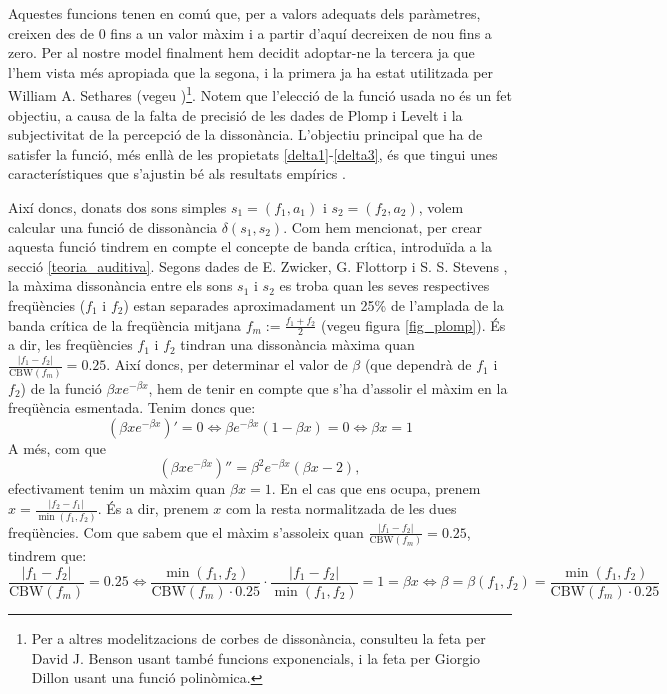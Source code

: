 \documentclass{article}
\theoremstyle{math}
\theoremstyle{TheoremNum}
\newcommand{\0}{\ensuremath{\vb{0}}}
\begin{document}
Aquestes funcions tenen en comú que, per a valors adequats dels paràmetres, creixen des de 0 fins a un valor màxim i a partir d'aquí decreixen de nou fins a zero. Per al nostre model finalment hem decidit adoptar-ne la tercera ja que l'hem vista més apropiada que la segona, i la primera ja ha estat utilitzada per William A. Sethares (vegeu \cite{sethares1})\footnote{Per a altres modelitzacions de corbes de dissonància, consulteu la feta per David J. Benson \cite{benson} usant també funcions exponencials, i la feta per Giorgio Dillon \cite{dillon} usant una funció polinòmica.}. Notem que l'elecció de la funció usada no és un fet objectiu, a causa de la falta de precisió de les dades de Plomp i Levelt i la subjectivitat de la percepció de la dissonància. L'objectiu principal que ha de satisfer la funció, més enllà de les propietats \ref{delta1}-\ref{delta3}, és que tingui unes característiques que s'ajustin bé als resultats empírics \cite{benson}.\par
Així doncs, donats dos sons simples $s_1=(f_1,a_1)$ i $s_2=(f_2,a_2)$, volem calcular una funció de dissonància $\delta(s_1,s_2)$. Com hem mencionat, per crear aquesta funció tindrem en compte el concepte de banda crítica, introduïda a la secció \ref{teoria_auditiva}. Segons dades de E. Zwicker, G. Flottorp i S. S. Stevens \cite{zwicker}, la màxima dissonància entre els sons $s_1$ i $s_2$ es troba quan les seves respectives freqüències ($f_1$ i $f_2$) estan separades aproximadament un 25\% de l'amplada de la banda crítica de la freqüència mitjana $f_m:=\frac{f_1+f_2}{2}$ (vegeu figura \ref{fig_plomp}). És a dir, les freqüències $f_1$ i $f_2$ tindran una dissonància màxima quan $\frac{|f_1-f_2|}{\text{CBW}(f_m)}=0.25$. Així doncs, per determinar el valor de $\beta$ (que dependrà de $f_1$ i $f_2$) de la funció $\beta xe^{-\beta x}$, hem de tenir en compte que s'ha d'assolir el màxim en la freqüència esmentada. Tenim doncs que:
$$\left(\beta xe^{-\beta x}\right)'=0\iff \beta e^{-\beta x}(1-\beta x)=0\iff\beta x=1$$ A més, com que $$\left(\beta xe^{-\beta x}\right)''=\beta^2e^{-\beta x}(\beta x-2),$$ efectivament tenim un màxim quan $\beta x=1$.
En el cas que ens ocupa, prenem $x=\frac{|f_2-f_1|}{\min(f_1,f_2)}$. És a dir, prenem $x$ com la resta normalitzada de les dues freqüències. Com que sabem que el màxim s'assoleix quan $\frac{|f_1-f_2|}{\text{CBW}(f_m)}=0.25$, tindrem que:
$$\frac{|f_1-f_2|}{\text{CBW}(f_m)}=0.25\iff\frac{\min(f_1, f_2)}{\text{CBW}(f_m)\cdot 0.25}\cdot\frac{|f_1-f_2|}{\min(f_1, f_2)}=1=\beta x\iff\beta=\beta(f_1,f_2)=\frac{\min(f_1, f_2)}{\text{CBW}(f_m)\cdot 0.25}$$
\end{document}
